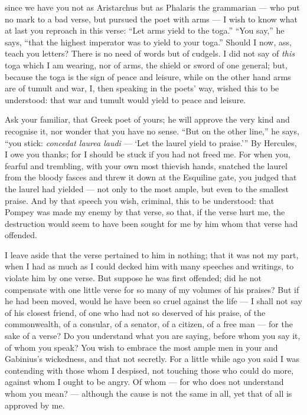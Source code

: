  since we have you not as Aristarchus but as Phalaris the grammarian — who put no mark to a bad verse, but pursued the poet with arms — I wish to know what at last you reproach in this verse: ``Let arms yield to the toga.'' ``You say,'' he says, ``that the highest imperator was to yield to your toga.'' Should I now, ass, teach you letters? There is no need of words but of cudgels. I did not say of \textit{this} toga which I am wearing, nor of arms, the shield or sword of one general; but, because the toga is the sign of peace and leisure, while on the other hand arms are of tumult and war, I, then speaking in the poets' way, wished this to be understood: that war and tumult would yield to peace and leisure.

 Ask your familiar, that Greek poet of yours; he will approve the very kind and recognise it, nor wonder that you have no sense. ``But on the other line,'' he says, ``you stick: \textit{concedat laurea laudi} — `Let the laurel yield to praise.''' By Hercules, I owe you thanks; for I should be stuck if you had not freed me. For when you, fearful and trembling, with your own most thievish hands, snatched the laurel from the bloody fasces and threw it down at the Esquiline gate, you judged that the laurel had yielded — not only to the most ample, but even to the smallest praise. And by that speech you wish, criminal, this to be understood: that Pompey was made my enemy by that verse, so that, if the verse hurt me, the destruction would seem to have been sought for me by him whom that verse had offended.

 I leave aside that the verse pertained to him in nothing; that it was not my part, when I had as much as I could decked him with many speeches and writings, to violate him by one verse. But suppose he was first offended; did he not compensate with one little verse for so many of my volumes of his praises? But if he had been moved, would he have been so cruel against the life — I shall not say of his closest friend, of one who had not so deserved of his praise, of the commonwealth, of a consular, of a senator, of a citizen, of a free man — for the sake of a verse? Do you understand what you are saying, before whom you say it, of whom you speak? You wish to embrace the most ample men in your and Gabinius's wickedness, and that not secretly. For a little while ago you said I was contending with those whom I despised, not touching those who could do more, against whom I ought to be angry. Of whom — for who does not understand whom you mean? — although the cause is not the same in all, yet that of all is approved by me.

